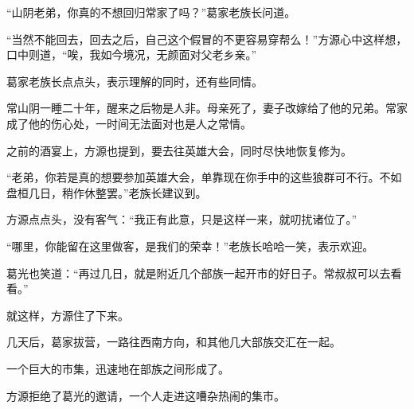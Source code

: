 \begin{this_body}
“山阴老弟，你真的不想回归常家了吗？”葛家老族长问道。

“当然不能回去，回去之后，自己这个假冒的不更容易穿帮么！”方源心中这样想，口中则道，“唉，我如今境况，无颜面对父老乡亲。”

葛家老族长点点头，表示理解的同时，还有些同情。

常山阴一睡二十年，醒来之后物是人非。母亲死了，妻子改嫁给了他的兄弟。常家成了他的伤心处，一时间无法面对也是人之常情。

之前的酒宴上，方源也提到，要去往英雄大会，同时尽快地恢复修为。

“老弟，你若是真的想要参加英雄大会，单靠现在你手中的这些狼群可不行。不如盘桓几日，稍作休整罢。”老族长建议到。

方源点点头，没有客气：“我正有此意，只是这样一来，就叨扰诸位了。”

“哪里，你能留在这里做客，是我们的荣幸！”老族长哈哈一笑，表示欢迎。

葛光也笑道：“再过几日，就是附近几个部族一起开市的好日子。常叔叔可以去看看。”

就这样，方源住了下来。

几天后，葛家拔营，一路往西南方向，和其他几大部族交汇在一起。

一个巨大的市集，迅速地在部族之间形成了。

方源拒绝了葛光的邀请，一个人走进这嘈杂热闹的集市。

\end{this_body}

